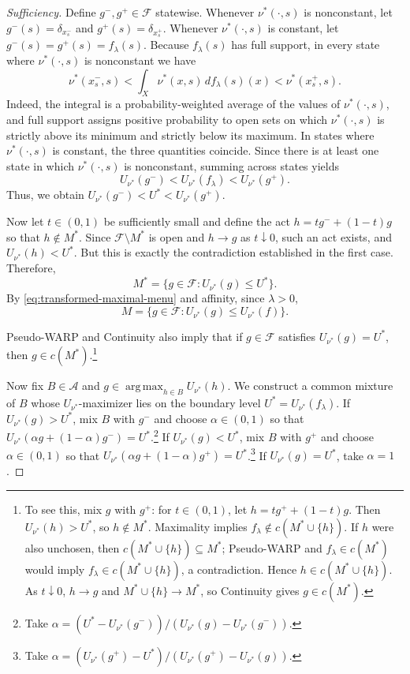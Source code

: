 \documentclass[11pt]{article}
\begin{document}
\begin{proof}[Sufficiency]
Define $g^-,g^+\in\mathcal{F}$ statewise. Whenever
$\nu^*(\cdot,s)$ is nonconstant, let $g^-(s)=\delta_{x_s^-}$ and
$g^+(s)=\delta_{x_s^+}$. Whenever $\nu^*(\cdot,s)$ is constant, let
$g^-(s)=g^+(s)=f_\lambda(s)$. Because $f_\lambda(s)$ has full
support, in every state where $\nu^*(\cdot,s)$ is nonconstant we have
\[
 \nu^*(x_s^-,s)
 <\int_X\nu^*(x,s)\,df_\lambda(s)(x)
 <\nu^*(x_s^+,s).
\]
Indeed, the integral is a probability-weighted average of the values of
$\nu^*(\cdot,s)$, and full support assigns positive probability to
open sets on which $\nu^*(\cdot,s)$ is strictly above its minimum and
strictly below its maximum. In states where $\nu^*(\cdot,s)$ is
constant, the three quantities coincide. Since there is at least one
state in which $\nu^*(\cdot,s)$ is nonconstant, summing across states
yields
\[
 U_{\nu^*}(g^-)<U_{\nu^*}(f_\lambda)<U_{\nu^*}(g^+).
\]
Thus, we obtain $U_{\nu^*}(g^-)<U^*<U_{\nu^*}(g^+)$.

Now let $t\in(0,1)$ be sufficiently small and define the act
$h=t g^-+(1-t)g$ so that $h\notin M^*$. Since
$\mathcal{F}\setminus M^*$ is open and $h\to g$ as $t\downarrow0$,
such an act exists, and $U_{\nu^*}(h)<U^*$. But this is exactly the
contradiction established in the first case. Therefore,
\begin{equation}\label{eq:exact-transformed-contour}
 M^*=\{g\in\mathcal{F}:U_{\nu^*}(g)\leq U^*\}.
\end{equation}
By \eqref{eq:transformed-maximal-menu} and affinity, since $\lambda>0$,
\begin{equation}\label{eq:original-maximal-contour}
 M=\{g\in\mathcal{F}:U_{\nu^*}(g)\leq U_{\nu^*}(f)\}.
\end{equation}

Pseudo-WARP and Continuity also imply that if $g\in\mathcal{F}$
satisfies $U_{\nu^*}(g)=U^*$, then $g\in c(M^*)$.\footnote{To see
this, mix $g$ with $g^+$: for $t\in(0,1)$, let
$h=t g^++(1-t)g$. Then $U_{\nu^*}(h)>U^*$, so $h\notin M^*$.
Maximality implies $f_\lambda\notin c(M^*\cup\{h\})$.
If $h$ were also unchosen, then $c(M^*\cup\{h\})\subseteq M^*$;
Pseudo-WARP and $f_\lambda\in c(M^*)$ would imply
$f_\lambda\in c(M^*\cup\{h\})$, a contradiction. Hence
$h\in c(M^*\cup\{h\})$. As $t\downarrow0$, $h\to g$ and
$M^*\cup\{h\}\to M^*$, so Continuity gives $g\in c(M^*)$.}

Now fix $B\in\mathcal{A}$ and
$g\in\operatorname*{arg\,max}_{h\in B}U_{\nu^*}(h)$. We construct a
common mixture of $B$ whose $U_{\nu^*}$-maximizer lies on the boundary
level $U^*=U_{\nu^*}(f_\lambda)$. If $U_{\nu^*}(g)>U^*$, mix
$B$ with $g^-$ and choose $\alpha\in(0,1)$ so that
$U_{\nu^*}(\alpha g+(1-\alpha)g^-)=U^*$.\footnote{Take
$\alpha=(U^*-U_{\nu^*}(g^-))/(U_{\nu^*}(g)-U_{\nu^*}(g^-))$.}
If $U_{\nu^*}(g)<U^*$, mix $B$ with $g^+$ and choose
$\alpha\in(0,1)$ so that
$U_{\nu^*}(\alpha g+(1-\alpha)g^+)=U^*$.\footnote{Take
$\alpha=(U_{\nu^*}(g^+)-U^*)/(U_{\nu^*}(g^+)-U_{\nu^*}(g))$.}
If $U_{\nu^*}(g)=U^*$, take $\alpha=1$.


\end{proof}
\end{document}
